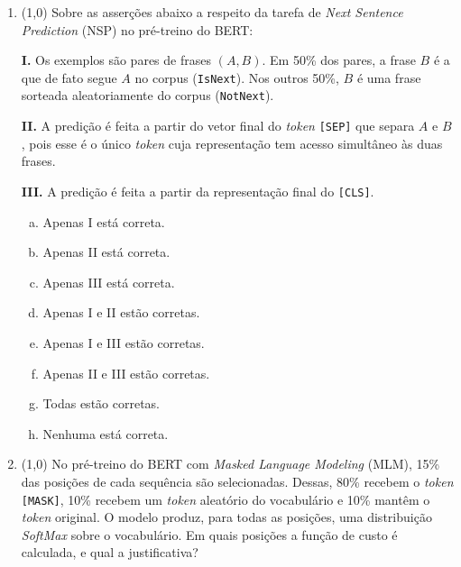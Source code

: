 \documentclass[11pt,a4paper]{article}
\begin{document}
\begin{enumerate}[1)]

\item (1{,}0) Sobre as asserções abaixo a respeito da tarefa de \textit{Next Sentence Prediction} (NSP) no pré-treino do BERT:

\textbf{I.} Os exemplos são pares de frases $(A, B)$. Em 50\% dos pares, a frase $B$ é a que de fato segue $A$ no corpus (\texttt{IsNext}). Nos outros 50\%, $B$ é uma frase sorteada aleatoriamente do corpus (\texttt{NotNext}).

\textbf{II.} A predição é feita a partir do vetor final do \textit{token} \texttt{[SEP]} que separa $A$ e $B$, pois esse é o único \textit{token} cuja representação tem acesso simultâneo às duas frases.

\textbf{III.} A predição é feita a partir da representação final do \texttt{[CLS]}.

\begin{enumerate}[a)]
    \item Apenas I está correta.
    \item Apenas II está correta.
    \item Apenas III está correta.
    \item Apenas I e II estão corretas.
    \item Apenas I e III estão corretas.
    \item Apenas II e III estão corretas.
    \item Todas estão corretas.
    \item Nenhuma está correta.
\end{enumerate}

\pagebreak
\item (1{,}0) No pré-treino do BERT com \textit{Masked Language Modeling} (MLM), 15\% das posições de cada sequência são selecionadas. Dessas, 80\% recebem o \textit{token} \texttt{[MASK]}, 10\% recebem um \textit{token} aleatório do vocabulário e 10\% mantêm o \textit{token} original. O modelo produz, para todas as posições, uma distribuição \textit{SoftMax} sobre o vocabulário. Em quais posições a função de custo é calculada, e qual a justificativa?


\end{enumerate}
\end{document}
